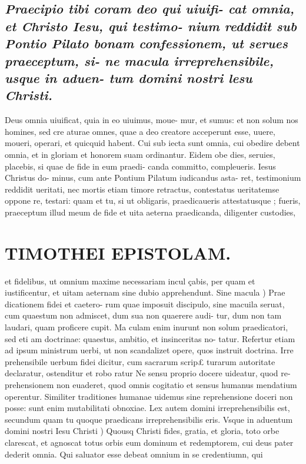 \documentclass{article}
\begin{document}
\begin{pages}
\subsection*{\textit{Praecipio tibi coram deo qui uiuifi- cat omnia, et Christo Iesu, qui testimo- nium reddidit sub Pontio Pilato bonam confessionem, ut serues praeceptum, si- ne macula irreprehensibile, usque in aduen- tum domini nostri lesu Christi. }}\pstart Deus omnia uiuificat, quia in eo uiuimus, moue- mur, et sumus: et non solum nos homines, sed cre aturae omnes, quae a deo creatore acceperunt esse, uuere, moueri, operari, et quicquid habent. Cui sub iecta sunt omnia, cui obedire debent omnia, et in gloriam et honorem suam ordinantur. Eidem obe dies, seruies, placebis, si quae de fide in eum praedi- canda committo, compleueris. Iesus Christus do- minus, cum ante Pontium Pilatum iudicandus asta- ret, testimonium reddidit ueritati, nec mortis etiam timore retractus, contestatus ueritatemse oppone re, testari: quam et tu, si ut obligaris, praedicaueris attestatusque ; fueris, praeceptum illud meum de fide et uita aeterna praedicanda, diligenter custodies,  \pend
\section*{TIMOTHEI EPISTOLAM. }
\marginpar{[ p.173 ]}\pstart et fidelibus, ut omnium maxime necessariam incul çabis, per quam et iustificentur, et uitam aeternam sine dubio apprehendunt.  \pend\pstart Sine macula ) Prae dicationem fidei et caetero- rum quae imposuit discipulo, sine macuila seruat, cum quaestum non admiscet, dum sua non quaerere audi- tur, dum non tam laudari, quam proficere cupit. Ma culam enim inurunt non solum praedicatori, sed eti am doctrinae: quaestus, ambitio, et insinceritas no- tatur. Refertur etiam ad ipsum ministrum uerbi, ut non scandalizet opere, quos instruit doctrina. Irre prehensibile uerbum fidei dicitur, cum sacrarum scrip£ turarum autoritate declaratur, ostenditur et robo ratur Ne sensu proprio docere uideatur, quod re- prehensionem non euaderet, quod omnis cogitatio et sensus humanus mendatium operentur. Similiter traditiones humanae uidemus sine reprehensione doceri non posse: sunt enim mutabilitati obnoxiae. Lex autem domini irreprehensibilis est, secundum quam tu quoque praedicans irreprehensibilis eris.  \pend\pstart Vsque in aduentum domini nostri Iesu Christi ) Quousq Christi fides, gratia, et gloria, toto orbe clarescat, et agnoscat totus orbis eum dominum et redemptorem, cui deus pater dederit omnia. Qui saluator esse debeat omnium in se credentiumn, qui  \pend

\end{pages}
\end{document}
